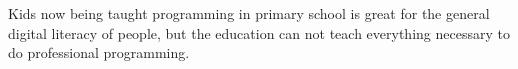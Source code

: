 Kids now being taught programming in primary school is great for the general digital literacy of people, but the education can not teach everything necessary to do professional programming.






